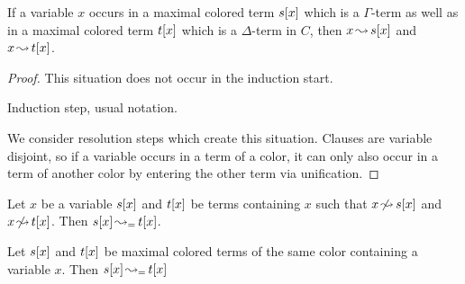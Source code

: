 \documentclass[,%
	paper=a4,%
	DIV9, %
	twoside=false,%
	liststotoc,
	bibtotoc,
	draft=false,%
	numbers=noendperiod
]{scrartcl}
\begin{document}
\begin{clemma}
	\label{lemma:arrow_from_one_color_to_other_color}
	If a variable $x$ occurs in a maximal colored term $s[x]$ which is a $\Gamma$-term as well as in a maximal colored term $t[x]$ which is a $\Delta$-term in $C$, then $x\operatorname{\leadsto} s[x]$ and $x\operatorname{\leadsto} t[x]$.
\end{clemma}
\begin{proof}
	This situation does not occur in the induction start.

	Induction step, usual notation.

	We consider resolution steps which create this situation. 
	Clauses are variable disjoint, so if a variable occurs in a term of a color, it can only also occur in a term of another color by entering the other term via unification.

\end{proof}


\begin{clemma}
	\label{wrong:same_color2}
	Let $x$ be a variable $s[x]$ and $t[x]$ be terms containing $x$ such that $x\operatorname{\not\leadsto} s[x]$ and $x\operatorname{\not\leadsto} t[x]$.
	\label{lemma:merge_arrow_between_same_colored_terms}
	Then $s[x] \operatorname{\leadsto_=} t[x]$.
\end{clemma}

\begin{clemma}
	\label{wrong:same_color}
	Let $s[x]$ and $t[x]$ be maximal colored terms of the same color containing a variable $x$. 
	Then $s[x] \operatorname{\leadsto_=} t[x]$
\end{clemma}
\end{document}
